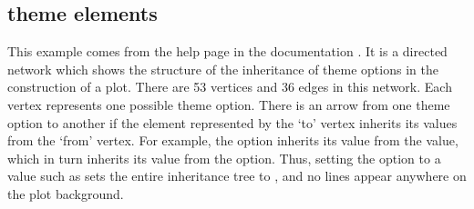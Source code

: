 \subsection{ theme elements}

This example comes from the  help page in the  documentation \citep{ggplot2}.  It is a directed network which shows the structure of the inheritance of theme options in the construction of a  plot. There are 53 vertices and 36 edges in this network. Each vertex represents one possible theme option. There is an arrow from one theme option to another if the element represented by the `to' vertex inherits its values from the `from' vertex.  For example, the  option inherits its value from the  value, which in turn inherits its value from the  option.  Thus, setting the  option to a value such as  sets the entire inheritance tree to , and no lines appear anywhere on the plot background.

